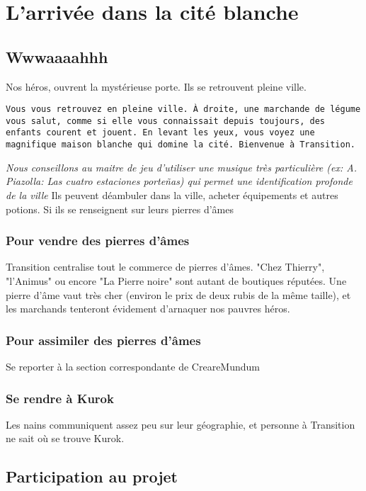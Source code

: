 \documentclass[a4paper]{article}
\begin{document}
\chapter{L'arrivée dans la cité blanche}
\section{Wwwaaaahhh}
Nos héros, ouvrent la mystérieuse porte. Ils se retrouvent pleine ville. 
\begin{flushright}
\texttt{Vous vous retrouvez en pleine ville. À droite, une marchande de légume vous salut, comme si elle vous connaissait depuis toujours, des enfants courent et jouent.
\newline
En levant les yeux, vous voyez une magnifique maison blanche qui domine la cité.
\newline
Bienvenue à Transition.}
\end{flushright}
\emph{Nous conseillons au maitre de jeu d'utiliser une musique très particulière (ex: A. Piazolla: Las cuatro estaciones porteñas) qui permet une identification profonde de la ville}
Ils peuvent déambuler dans la ville, acheter équipements et autres potions. Si ils se renseignent sur leurs pierres d'âmes
\subsection{Pour vendre des pierres d'âmes}
Transition centralise tout le commerce de pierres d'âmes. "Chez Thierry", "l'Animus" ou encore "La Pierre noire" sont autant de boutiques réputées. Une pierre d'âme vaut très cher (environ le prix de deux rubis de la même taille), et les marchands tenteront évidement d'arnaquer nos pauvres héros.
\subsection{Pour assimiler des pierres d'âmes}
Se reporter à la section correspondante de CreareMundum
\subsection{Se rendre à Kurok}
Les nains communiquent assez peu sur leur géographie, et personne à Transition ne sait où se trouve Kurok.


\newpage
\section{Participation au projet}
\end{document}
